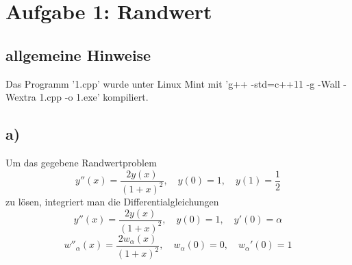 \documentclass{scrreprt}
\begin{document}
\chapter*{Aufgabe 1: Randwert}
\section*{allgemeine Hinweise}
Das Programm '1.cpp' wurde unter Linux Mint mit 'g++ -std=c++11 -g -Wall -Wextra 1.cpp -o 1.exe' kompiliert.

\section*{a)}
Um das gegebene Randwertproblem 
\[
y''(x)=\frac{2y(x)}{(1+x)^2},\quad y(0)=1,\quad y(1)=\frac{1}{2}
\]
zu lösen, integriert man die Differentialgleichungen
\[
y''(x) = \frac{2y(x)}{(1+x)^2}, \quad y(0)=1, \quad y'(0)=\alpha
\]
\[
w''_\alpha(x)=\frac{2w_\alpha(x)}{(1+x)^2},\quad w_\alpha(0)=0, \quad w_\alpha'(0)=1
\]
\end{document}
